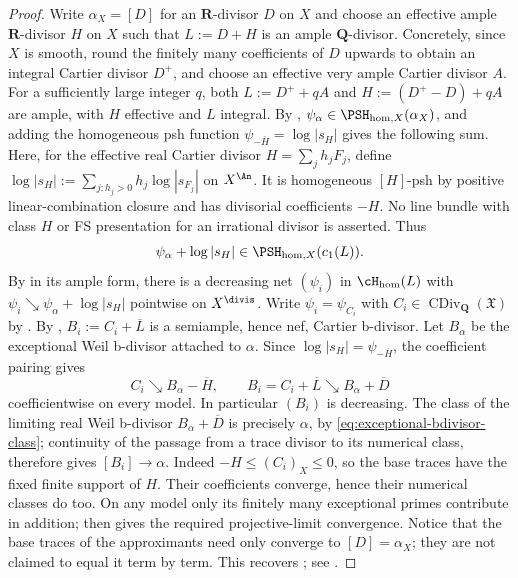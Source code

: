 \begin{proof}
Write $\alpha_X=[D]$ for an $\mathbf R$-divisor $D$ on $X$ and
choose an effective ample $\mathbf R$-divisor $H$ on $X$ such that
$L:=D+H$ is an ample $\mathbf Q$-divisor. Concretely, since $X$ is smooth,
round the finitely many coefficients of $D$ upwards to obtain an integral
Cartier divisor $D^+$, and choose an effective very ample Cartier divisor $A$.
For a sufficiently large integer $q$, both $L:=D^++qA$ and
$H:=(D^+-D)+qA$ are ample, with $H$ effective and $L$ integral.  By
,
$\psi_\alpha\in\PSH_{\mathrm{hom},X}(\alpha_X)$, and adding the
homogeneous psh function $\psi_{-\overline H}=\log|s_H|$ gives the
following sum. Here, for the effective real Cartier divisor
$H=\sum_jh_jF_j$, define
$\log|s_H|:=\sum_{j:h_j>0}h_j\log|s_{F_j}|$ on $X^{\An}$.
It is homogeneous $[H]$-psh by positive linear-combination closure and
has divisorial coefficients $-H$. No line bundle with class $H$ or FS
presentation for an irrational divisor is asserted. Thus
\[
 \psi_\alpha+\log|s_H|\in\PSH_{\mathrm{hom},X}(c_1(L)).
\]
By  in its ample form, there is a
decreasing net $(\psi_i)$ in $\cH_{\mathrm{hom}}(L)$ with
$\psi_i\searrow\psi_\alpha+\log|s_H|$ pointwise on $X^{\divis}$.  Write
$\psi_i=\psi_{C_i}$ with $C_i\in\operatorname{CDiv}_{\mathbf Q}(\mathfrak X)$
by .  By
, $B_i:=C_i+\overline L$ is a semiample,
hence nef, Cartier b-divisor.  Let $B_\alpha$ be the exceptional Weil
b-divisor attached to $\alpha$.  Since
$\log|s_H|=\psi_{-\overline H}$, the coefficient pairing gives
\[
 C_i\searrow B_\alpha-\overline H,
 \qquad
 B_i=C_i+\overline L\searrow B_\alpha+\overline D
\]
coefficientwise on every model.  In particular $(B_i)$ is decreasing.
The class of the limiting real Weil b-divisor
$B_\alpha+\overline D$ is precisely $\alpha$, by
\eqref{eq:exceptional-bdivisor-class}; continuity of the passage from a
trace divisor to its numerical class, therefore gives $[B_i]\to\alpha$. Indeed
$-H\leq(C_i)_X\leq0$, so the base traces have the fixed finite support
of $H$. Their coefficients converge, hence their numerical classes do too.
On any model only its finitely many exceptional primes contribute in
addition;  then gives the required
projective-limit convergence.
Notice that the base traces of the approximants need only converge to
$[D]=\alpha_X$; they are not claimed to equal it term by term.  This
recovers
\cite[Theorem~A]{DF20}; see \cite[Corollary~6.41]{BJ22}.
\end{proof}


